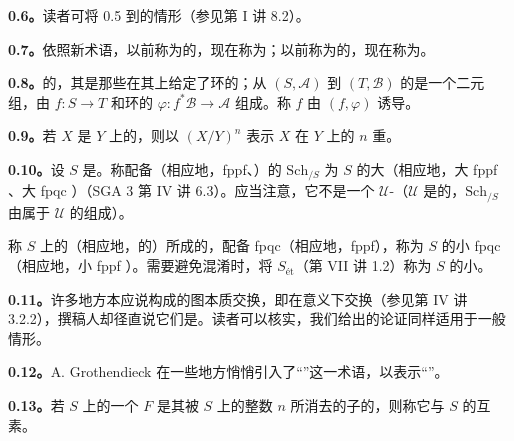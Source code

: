 \textbf{0.6。}读者可将 0.5 到的情形（参见第 I 讲 8.2）。

\textbf{0.7。}依照新术语，以前称为的，现在称为；以前称为的，现在称为。

\textbf{0.8。}的，其是那些在其上给定了环的；从 $(S,\mathcal A)$ 到 $(T,\mathcal B)$ 的是一个二元组，由 $f:S\to T$ 和环的 $\varphi:f^*\mathcal B\to\mathcal A$ 组成。称 $f$ 由 $(f,\varphi)$ 诱导。

\textbf{0.9。}若 $X$ 是 $Y$ 上的，则以 $(X/Y)^n$ 表示 $X$ 在 $Y$ 上的 $n$ 重。

\textbf{0.10。}设 $S$ 是。称配备（相应地，fppf、）的 $\mathrm{Sch}_{/S}$ 为 $S$ 的大（相应地，大 fppf 、大 fpqc ）（SGA 3 第 IV 讲 6.3）。应当注意，它不是一个 $\mathcal U$-（$\mathcal U$ 是的，$\mathrm{Sch}_{/S}$ 由属于 $\mathcal U$ 的组成）。

称 $S$ 上的（相应地，的）所成的，配备 fpqc（相应地，fppf），称为 $S$ 的小 fpqc （相应地，小 fppf ）。需要避免混淆时，将 $S_{\text{ét}}$（第 VII 讲 1.2）称为 $S$ 的小。

\textbf{0.11。}许多地方本应说构成的图本质交换，即在意义下交换（参见第 IV 讲 3.2.2），撰稿人却径直说它们是。读者可以核实，我们给出的论证同样适用于一般情形。

\textbf{0.12。}A. Grothendieck 在一些地方悄悄引入了“”这一术语，以表示“”。

\textbf{0.13。}若 $S$ 上的一个 $F$ 是其被 $S$ 上的整数 $n$ 所消去的子的，则称它与 $S$ 的互素。

